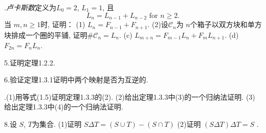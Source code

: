 \documentclass{ctexbook}
\begin{document}
.\textsl{卢卡斯数}定义为$L_{0}=2$, $ L_{1}=1$, 且
$$
L_{n}=L_{n-1}+L_{n-2} \text { for } n \geqslant 2.
$$
当 $m, n \geqslant 1$时, 证明：
(1) $L_{n}=F_{n-1}+F_{n+1}$.
(2)设$\mathcal{C}_{n}$为 $n$个箱子以双方块和单方块排成一个圈的平铺, 证明$\# \mathcal{C}_{n}=L_{n}$.
(c) $L_{m+n}=F_{m-1} L_{n}+F_{m} L_{n+1}$.
(d) $F_{2 n}=F_{n} L_{n}$.

\noindent5.证明定理1.2.2.

\noindent6.验证定理1.3.1证明中两个映射是否为互逆的.

.(1)用等式(1.5)证明定理1.3.3的(2).
(2)给出定理1.3.3中(3)的一个归纳法证明.
(3)给出定理1.3.3中(4)的一个归纳法证明.

\noindent8.设 $S$, $T$为集合.
(1)证明 $S \Delta T=(S \cup T)-(S \cap T)$
(2)证明 $(S \Delta T) \Delta T=S$
.
\end{document}
